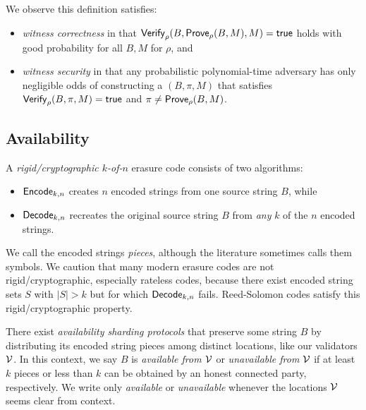 We observe this definition satisfies:
\begin{itemize}
\item {\em witness correctness} in that $\mathsf{Verify}_{\rho}(B,\mathsf{Prove}_{\rho}(B,M),M) = \mathsf{true}$ holds with good probability for all $B,M$ for $\rho$, and
\item {\em witness security} in that 
any probabilistic polynomial-time adversary has only negligible odds of constructing a $(B,\pi,M)$ that satisfies $\mathsf{Verify}_{\rho}(B,\pi,M) = \mathsf{true}$ and $\pi \ne \mathsf{Prove}_{\rho}(B,M)$.
\end{itemize}

\subsection{Availability}

A {\em rigid/cryptographic $k$-of-$n$} erasure code consists of two algorithms:
\begin{itemize}
\item $\mathsf{Encode}_{k,n}$ creates $n$ encoded strings from one source string $B$, while
\item $\mathsf{Decode}_{k,n}$ recreates the original source string $B$ from {\em any} $k$ of the $n$ encoded strings.
\end{itemize}
We call the encoded strings {\em pieces}, although the literature sometimes calls them symbols.  We caution that many modern erasure codes are not rigid/cryptographic, especially rateless codes, because there exist encoded string sets $S$ with $|S| > k$ but for which $\mathsf{Decode}_{k,n}$ fails.  Reed-Solomon codes satisfy this rigid/cryptographic property.

There exist {\em availability sharding protocols} that preserve some string $B$ by distributing its encoded string pieces among distinct locations, like our validators $\mathcal{V}$.  In this context, we say $B$ is {\em available from $\mathcal{V}$} or {\em unavailable from $\mathcal{V}$} if at least $k$ pieces or less than $k$ can be obtained by an honest connected party, respectively.  We write only  {\em available} or {\em unavailable} whenever the locations $\mathcal{V}$ seems clear from context.



